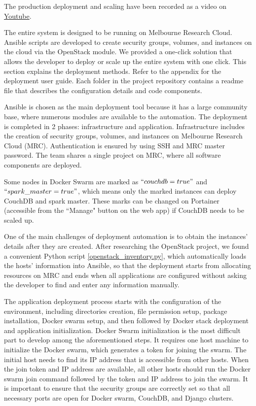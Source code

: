 The production deployment and scaling have been recorded as a video on \href{https://youtu.be/cqmxZdLdOyk}{Youtube}.

The entire system is designed to be running on Melbourne Research Cloud. Ansible scripts are developed to create security groups, volumes, and instances on the cloud via the OpenStack module. We provided a one-click solution that allows the developer to deploy or scale up the entire system with one click. This section explains the deployment methods. Refer to the appendix for the deployment user guide. Each folder in the project repository contains a readme file that describes the configuration details and code components.

Ansible is chosen as the main deployment tool because it has a large community base, where numerous modules are available to the automation. The deployment is completed in 2 phases: infrastructure and application. Infrastructure includes the creation of security groups, volumes, and instances on Melbourne Research Cloud (MRC). Authentication is ensured by using SSH and MRC master password. The team shares a single project on MRC, where all software components are deployed.

Some nodes in Docker Swarm are marked as $``couchdb=true"$ and $``spark\_master=true"$, which means only the marked instances can deploy CouchDB and spark master. These marks can be changed on Portainer (accessible from the ``Manage" button on the web app) if CouchDB needs to be scaled up. 

One of the main challenges of deployment automation is to obtain the instances' details after they are created. After researching the OpenStack project, we found a convenient Python script \href{https://docs.ansible.com/ansible/latest/user_guide/intro_dynamic_inventory.html}{[openstack\_inventory.py]}, which automatically loads the hosts' information into Ansible, so that the deployment starts from allocating resources on MRC and ends when all applications are configured without asking the developer to find and enter any information manually.

The application deployment process starts with the configuration of the environment, including directories creation, file permission setup, package installation, Docker swarm setup, and then followed by Docker stack deployment and application initialization. Docker Swarm initialization is the most difficult part to develop among the aforementioned steps. It requires one host machine to initialize the Docker swarm, which generates a token for joining the swarm. The initial host needs to find its IP address that is accessible from other hosts. When the join token and IP address are available, all other hosts should run the Docker swarm join command followed by the token and IP address to join the swarm. It is important to ensure that the security groups are correctly set so that all necessary ports are open for Docker swarm, CouchDB, and Django clusters. 

